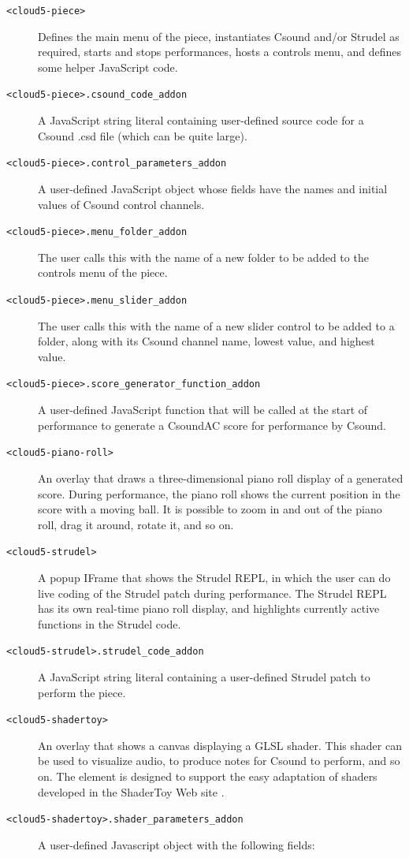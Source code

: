 \documentclass[runningheads,a4paper]{llncs}
\begin{document}
\begin{description}
\item[\texttt{<cloud5-piece>}] Defines the main menu of the piece, instantiates Csound and/or Strudel as required, starts and stops performances, hosts a controls menu, and defines some helper JavaScript code.
\item[\texttt{<cloud5-piece>.csound\_code\_addon}]  A JavaScript string literal containing user-defined source code for a Csound .csd file (which can be quite large).
\item[\texttt{<cloud5-piece>.control\_parameters\_addon}]  A user-defined JavaScript object whose fields have the names and initial values of Csound control channels.
\item[\texttt{<cloud5-piece>.menu\_folder\_addon}]  The user calls this with the name of a new folder to be added to the controls menu of the piece.
\item[\texttt{<cloud5-piece>.menu\_slider\_addon}]  The user calls this with the name of a new slider control to be added to a folder, along with its Csound channel name, lowest value, and highest value.
\item[\texttt{<cloud5-piece>.score\_generator\_function\_addon}]  A user-defined JavaScript function that will be called at the start of performance to generate a CsoundAC score for performance by Csound. 
\item[\texttt{<cloud5-piano-roll>}] An overlay that draws a three-dimensional piano roll display of a generated score. During performance, the piano roll shows the current position in the score with a moving ball. It is possible to zoom in and out of the piano roll, drag it around, rotate it, and so on.
\item[\texttt{<cloud5-strudel>}] A popup IFrame that shows the Strudel REPL, in which the user can do live coding of the Strudel patch during performance. The Strudel REPL has its own real-time piano roll display, and highlights currently active functions in the Strudel code.
\item[\texttt{<cloud5-strudel>.strudel\_code\_addon}] A JavaScript string literal containing a user-defined  Strudel patch to perform the piece.
\item[\texttt{<cloud5-shadertoy>}] An overlay that shows a canvas displaying a GLSL shader. This shader can be used to visualize audio, to produce notes for Csound to perform, and so on. The element is designed to support the easy adaptation of shaders developed in the ShaderToy Web site \cite{shadertoy}.
\item[\texttt{<cloud5-shadertoy>.shader\_parameters\_addon}] A user-defined Javascript object with the following fields:

\end{description}
\end{document}
